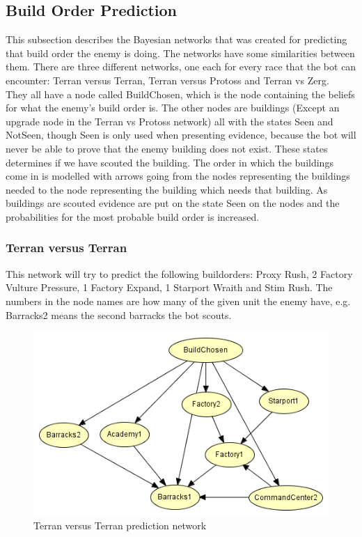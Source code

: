 \subsection{Build Order Prediction}
	This subsection describes the Bayesian networks that was created for predicting that build order the enemy is doing. 
	The networks have some similarities between them. There are three different networks, one each for every race that the bot can encounter: 
	Terran versus Terran, Terran versus Protoss and Terran vs Zerg.  \\
	
	They all have a node called BuildChosen, which is the node containing the beliefs for what the enemy's build order is. 
	The other nodes are buildings (Except an upgrade node in the Terran vs Protoss network) all with the states Seen and NotSeen, 
	though Seen is only used when presenting evidence, because the bot will never be able to prove that the enemy building does not exist. 
	These states determines if we have scouted the building. 
	The order in which the buildings come in is modelled with arrows going from the nodes representing the buildings needed to the node 
	representing the building which needs that building. 
	As buildings are scouted evidence are put on the state Seen on the nodes and the probabilities for the most probable build order is increased.

\subsubsection{Terran versus Terran}
	This network will try to predict the following buildorders: Proxy Rush, 2 Factory Vulture Pressure, 1 Factory Expand, 1 Starport Wraith and Stim Rush. 
	The numbers in the node names are how many of the given unit the enemy have, e.g. Barracks2 means the second barracks the bot scouts. 
	
\begin{figure}[H]
	\includegraphics{Figures/BayesianPictures/tvt.png}
	\caption{Terran versus Terran prediction network}
	\label{fig:tvtnetwork}
\end{figure}			
